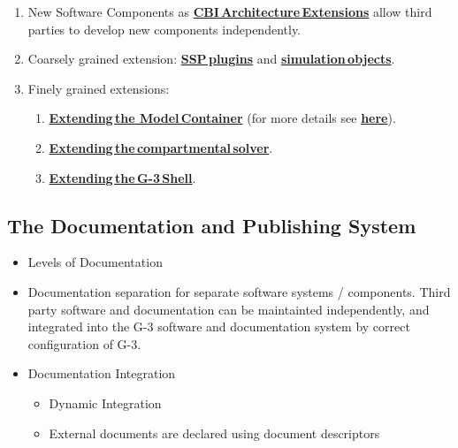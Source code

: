 \documentclass[12pt]{article}
\begin{document}
\begin{enumerate}
\item New Software Components as
  \href{../genesis-addto-component-developerpackage/genesis-addto-component-developerpackage.tex}{\bf CBI\,Architecture\,Extensions} allow third parties to develop new
  components independently.
\item Coarsely grained extension:
  \href{../genesis-add-feature-ssp/genesis-add-feature-ssp.tex}{\bf SSP\,plugins} and
  \href{../genesis-add-object-solver/genesis-add-object-solver.tex}{\bf simulation\,objects}.
\item Finely grained extensions:
  \begin{enumerate}
  \item
    \href{../genesis-extend-model-container/genesis-extend-model-container.tex}{\bf Extending\,the Model\,Container} (for more details see
    \href{../genesis-extend-model-container-detail/genesis-extend-model-container-detail.tex}{\bf here}).
  \item
    \href{../genesis-add-object-solver/genesis-add-object-solver.tex}{\bf Extending\,the\,compartmental\,solver}.
  \item \href{../genesis-add-object-solver/genesis-add-object-solver.tex}{\bf Extending\,the\,G-3\,Shell}.
  \end{enumerate}
\end{enumerate}



\subsection{The Documentation and Publishing System}

\begin{itemize}
\item Levels of Documentation
\item Documentation separation for separate software systems /
  components.  Third party software and documentation can be
  maintainted independently, and integrated into the G-3 software and
  documentation system by correct configuration of G-3.
\item Documentation Integration
  \begin{itemize}
  \item Dynamic Integration
  \item External documents are declared using document descriptors
  \end{itemize}
\end{itemize}
\end{document}
